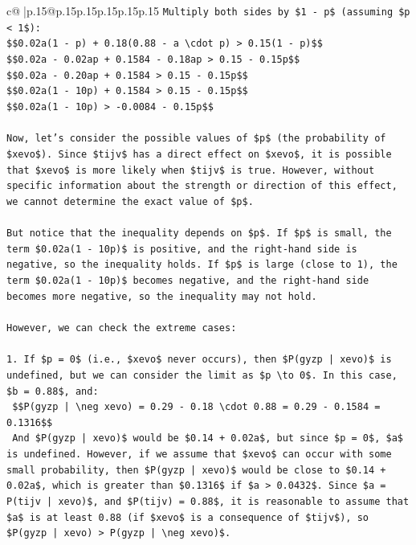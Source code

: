 \documentclass{article}
\begin{document}
{\begin{supertabular}{c@{$\;$}|p{.15\linewidth}@{}p{.15\linewidth}p{.15\linewidth}p{.15\linewidth}p{.15\linewidth}p{.15\linewidth}}
{{{\texttt{Multiply both sides by \$1 {-} p\$ (assuming \$p < 1\$):} \\
\texttt{\$\$0.02a(1 {-} p) + 0.18(0.88 {-} a \textbackslash{}cdot p) > 0.15(1 {-} p)\$\$} \\
\texttt{\$\$0.02a {-} 0.02ap + 0.1584 {-} 0.18ap > 0.15 {-} 0.15p\$\$} \\
\texttt{\$\$0.02a {-} 0.20ap + 0.1584 > 0.15 {-} 0.15p\$\$} \\
\texttt{\$\$0.02a(1 {-} 10p) + 0.1584 > 0.15 {-} 0.15p\$\$} \\
\texttt{\$\$0.02a(1 {-} 10p) > {-}0.0084 {-} 0.15p\$\$} \\
\\ 
\texttt{Now, let's consider the possible values of \$p\$ (the probability of \$xevo\$). Since \$tijv\$ has a direct effect on \$xevo\$, it is possible that \$xevo\$ is more likely when \$tijv\$ is true. However, without specific information about the strength or direction of this effect, we cannot determine the exact value of \$p\$.} \\
\\ 
\texttt{But notice that the inequality depends on \$p\$. If \$p\$ is small, the term \$0.02a(1 {-} 10p)\$ is positive, and the right{-}hand side is negative, so the inequality holds. If \$p\$ is large (close to 1), the term \$0.02a(1 {-} 10p)\$ becomes negative, and the right{-}hand side becomes more negative, so the inequality may not hold.} \\
\\ 
\texttt{However, we can check the extreme cases:} \\
\\ 
\texttt{1. If \$p = 0\$ (i.e., \$xevo\$ never occurs), then \$P(gyzp | xevo)\$ is undefined, but we can consider the limit as \$p \textbackslash{}to 0\$. In this case, \$b = 0.88\$, and:} \\
\texttt{   \$\$P(gyzp | \textbackslash{}neg xevo) = 0.29 {-} 0.18 \textbackslash{}cdot 0.88 = 0.29 {-} 0.1584 = 0.1316\$\$} \\
\texttt{   And \$P(gyzp | xevo)\$ would be \$0.14 + 0.02a\$, but since \$p = 0\$, \$a\$ is undefined. However, if we assume that \$xevo\$ can occur with some small probability, then \$P(gyzp | xevo)\$ would be close to \$0.14 + 0.02a\$, which is greater than \$0.1316\$ if \$a > 0.0432\$. Since \$a = P(tijv | xevo)\$, and \$P(tijv) = 0.88\$, it is reasonable to assume that \$a\$ is at least 0.88 (if \$xevo\$ is a consequence of \$tijv\$), so \$P(gyzp | xevo) > P(gyzp | \textbackslash{}neg xevo)\$.} \\
}}}
\end{supertabular}}
\end{document}
